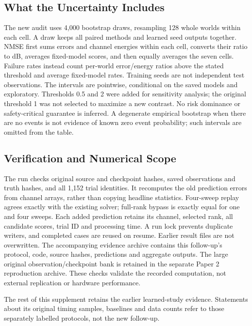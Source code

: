 \subsection{What the Uncertainty Includes}
The new audit uses 4,000 bootstrap draws, resampling 128 whole worlds
within each cell. A draw keeps all paired methods and learned seed
outputs together. NMSE first sums errors and channel energies within
each cell, converts their ratio to dB, averages fixed-model scores,
and then equally averages the seven cells. Failure rates instead count
per-world error/energy ratios above the stated threshold and average
fixed-model rates. Training seeds are not independent test observations.
The intervals are pointwise, conditional on the saved models and
exploratory. Thresholds 0.5 and 2 were added for sensitivity analysis;
the original threshold 1 was not selected to maximize a new contrast.
No risk dominance or safety-critical guarantee is inferred. A degenerate
empirical bootstrap when there are no events is not evidence of known
zero event probability; such intervals are omitted from the table.

\subsection{Verification and Numerical Scope}
The run checks original source and checkpoint hashes, saved observations
and truth hashes, and all 1,152 trial identities. It recomputes the old
prediction errors from channel arrays, rather than copying headline
statistics. Four-sweep replay agrees exactly with the existing solver;
full-rank bypass is exactly equal for one and four sweeps. Each added
prediction retains its channel, selected rank, all candidate scores,
trial ID and processing time. A run lock prevents duplicate writers,
and completed cases are reused on resume. Earlier result files are not
overwritten. The accompanying evidence archive contains this follow-up's
protocol, code, source hashes, predictions and aggregate outputs. The
large original observation/checkpoint bank is retained in the separate
Paper 2 reproduction archive. These checks validate the recorded
computation, not external replication or hardware performance.

The rest of this supplement retains the earlier learned-study evidence.
Statements about its original timing samples, baselines and data counts
refer to those separately labelled protocols, not the new follow-up.
